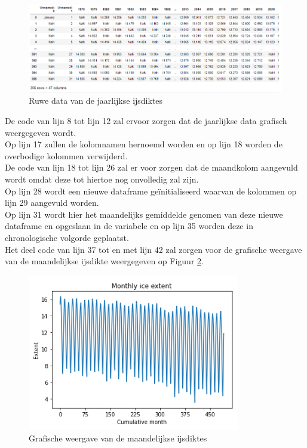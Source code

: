 \begin{figure}
    \centering
    \caption{Ruwe data van de jaarlijkse ijsdiktes}
    \label{fig:icedataraw}
    \includegraphics[width=1\linewidth]{ice_data_rawpng}
\end{figure}

De code van lijn 8 tot lijn 12 zal ervoor zorgen dat de jaarlijkse data grafisch weergegeven wordt. \\
Op lijn 17 zullen de kolomnamen hernoemd worden en op lijn 18 worden de overbodige kolommen verwijderd. \\

De code van lijn 18 tot lijn 26 zal er voor zorgen dat de maandkolom aangevuld wordt omdat deze tot hiertoe nog onvolledig zal zijn. \\
Op lijn 28 wordt een nieuwe dataframe ge\"{i}nitialiseerd waarvan de kolommen op lijn 29 aangevuld worden. \\
Op lijn 31 wordt hier het maandelijks gemiddelde genomen van deze nieuwe dataframe en opgeslaan in de variabele en op lijn 35 worden deze in chronologische volgorde geplaatst.\\

Het deel code van lijn 37 tot en met lijn 42 zal zorgen voor de grafische weergave van de maandelijkse ijsdikte weergegeven op Figuur \ref{fig:iceextentmonthly}. \\

\begin{figure}
    \centering
    \caption{Grafische weergave van de maandelijkse ijsdiktes}
    \label{fig:iceextentmonthly}
    \includegraphics[width=0.7\linewidth]{ice_extent_monthly}
\end{figure}

